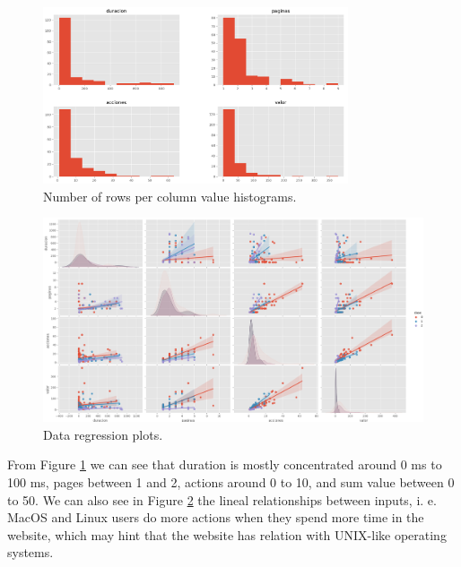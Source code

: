\documentclass[10pt]{article}
\begin{document}
\begin{figure}[h]
  \centering
  \includegraphics[width=90mm]{./images/2025-03-28-09-59-15.png}
  \caption{Number of rows per column value histograms.}
  \label{fig:hist}
\end{figure}
\begin{figure}[h]
  \centering
  \includegraphics[width=130mm]{./images/2025-03-28-10-02-08.png}
  \caption{Data regression plots.}
  \label{fig:regplots}
\end{figure}
\newpage
From Figure \ref{fig:hist} we can see that duration is mostly concentrated around 0 ms to 100 ms, pages between 1 and 2, actions around 0 to 10, and sum value between 0 to 50. We can also see in Figure \ref{fig:regplots} the lineal relationships between inputs, i. e. MacOS and Linux users do more actions when they spend more time in the website, which may hint that the website has relation with UNIX-like operating systems.
\end{document}
